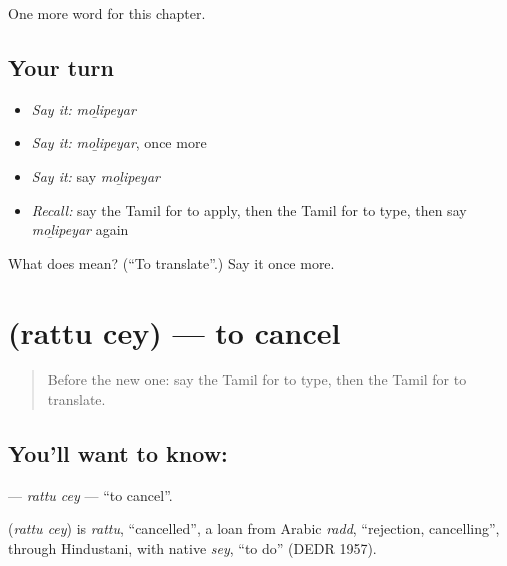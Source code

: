 \begin{grammarlens}[title={What you've built}]
One more word for this chapter.
\end{grammarlens}

\subsection*{Your turn}
\begin{itemize}
\raggedright
  \item \emph{Say it:} \emph{moḻipeyar}
  \item \emph{Say it:} \emph{moḻipeyar}, once more
  \item \emph{Say it:} say \emph{moḻipeyar}
  \item \emph{Recall:} say the Tamil for to apply, then the Tamil for to type, then say \emph{moḻipeyar} again
\end{itemize}

\begin{tcolorbox}[breakable,colback=teal!4,colframe=teal!35!black,title={Before you move on}]
What does  mean? (\textquotedblleft{}To translate\textquotedblright{}.) Say it once more.
\end{tcolorbox}
\section[\texorpdfstring{\ta{ரத்து} \ta{செய்} (rattu cey)}{ரத்து செய் (rattu cey)}]{  (rattu cey) — to cancel}

\label{lesson:TA-C228-rattu-cey}



\begin{quote}
Before the new one: say the Tamil for to type, then the Tamil for to translate.
\end{quote}

\subsection*{You'll want to know:  }
\textbf{ } — \emph{rattu cey} — \textquotedblleft{}to cancel\textquotedblright{}.

\begin{cousinweb}
\textbf{ } (\emph{rattu cey}) is \emph{rattu}, \textquotedblleft{}cancelled\textquotedblright{}, a loan from Arabic \emph{radd}, \textquotedblleft{}rejection, cancelling\textquotedblright{}, through Hindustani, with native \emph{sey}, \textquotedblleft{}to do\textquotedblright{} (DEDR 1957).
\end{cousinweb}

